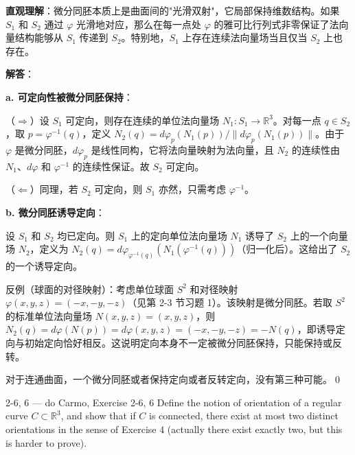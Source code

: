 \begin{solution}
\textbf{直观理解}：微分同胚本质上是曲面间的"光滑双射"，它局部保持维数结构。如果 $S_1$ 和 $S_2$ 通过 $\varphi$ 光滑地对应，那么在每一点处 $\varphi$ 的雅可比行列式非零保证了法向量结构能够从 $S_1$ 传递到 $S_2$。特别地，$S_1$ 上存在连续法向量场当且仅当 $S_2$ 上也存在。

\textbf{解答}：

\textbf{a. 可定向性被微分同胚保持}：

（$\Rightarrow$）设 $S_1$ 可定向，则存在连续的单位法向量场 $N_1: S_1 \to \mathbb{R}^3$。对每一点 $q \in S_2$，取 $p = \varphi^{-1}(q)$，定义 $N_2(q) = d\varphi_p(N_1(p)) / \|d\varphi_p(N_1(p))\|$。由于 $\varphi$ 是微分同胚，$d\varphi_p$ 是线性同构，它将法向量映射为法向量，且 $N_2$ 的连续性由 $N_1$、$d\varphi$ 和 $\varphi^{-1}$ 的连续性保证。故 $S_2$ 可定向。

（$\Leftarrow$）同理，若 $S_2$ 可定向，则 $S_1$ 亦然，只需考虑 $\varphi^{-1}$。

\textbf{b. 微分同胚诱导定向}：

设 $S_1$ 和 $S_2$ 均已定向。则 $S_1$ 上的定向单位法向量场 $N_1$ 诱导了 $S_2$ 上的一个向量场 $N_2$，定义为 $N_2(q) = d\varphi_{\varphi^{-1}(q)}(N_1(\varphi^{-1}(q)))$（归一化后）。这给出了 $S_2$ 的一个诱导定向。

反例（球面的对径映射）：考虑单位球面 $S^2$ 和对径映射 $\varphi(x, y, z) = (-x, -y, -z)$（见第 2-3 节习题 1）。该映射是微分同胚。若取 $S^2$ 的标准单位法向量场 $N(x,y,z) = (x,y,z)$，则 $N_2(q) = d\varphi(N(p)) = d\varphi(x,y,z) = (-x,-y,-z) = -N(q)$，即诱导定向与初始定向恰好相反。这说明定向本身不一定被微分同胚保持，只能保持或反转。

对于连通曲面，一个微分同胚或者保持定向或者反转定向，没有第三种可能。\qed
\end{solution}

\begin{exercise}{2-6, 6 — do Carmo, Exercise 2-6, 6}
Define the notion of orientation of a regular curve $C \subset \mathbb{R}^3$, and show that if $C$ is connected, there exist at most two distinct orientations in the sense of Exercise 4 (actually there exist exactly two, but this is harder to prove).
\end{exercise}

